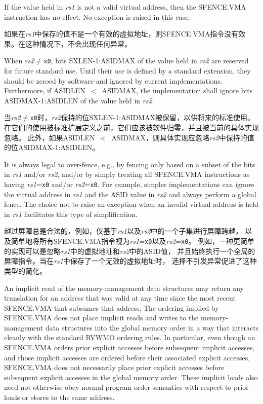 If the value held in {\em rs1} is not a valid virtual address, then the
SFENCE.VMA instruction has no effect.  No exception is raised in this case.

如果在{\em rs1}中保存的值不是一个有效的虚拟地址，则SFENCE.VMA指令没有效果。在这种情况下，不会出现任何异常。

When {\em rs2}$\neq${\tt x0}, bits SXLEN-1:ASIDMAX of the value held in {\em
rs2} are reserved for future standard use.  Until their use is defined by a
standard extension, they should be zeroed by software and ignored
by current implementations.  Furthermore, if ASIDLEN~$<$~ASIDMAX, the
implementation shall ignore bits ASIDMAX-1:ASIDLEN of the value held in {\em
rs2}.

当{\em rs2}$\neq${\tt x0}时，{\em rs2}保持的位SXLEN-1:ASIDMAX被保留，以供将来的标准使用。
在它们的使用被标准扩展定义之前，它们应该被软件归零，并且被当前的具体实现忽略。
此外，如果ASIDLEN~$<$~ASIDMAX，则具体实现应忽略{\em rs2}中保持的值的位ASIDMAX-1:ASIDLEN。

\begin{commentary}
It is always legal to over-fence, e.g., by fencing only based on a subset
of the bits in {\em rs1} and/or {\em rs2}, and/or by simply treating all
SFENCE.VMA instructions as having {\em rs1}={\tt x0} and/or
{\em rs2}={\tt x0}.  For example, simpler implementations can ignore the
virtual address in {\em rs1} and the ASID value in {\em rs2} and always perform
a global fence.  The choice not to raise an exception when an invalid virtual
address is held in {\em rs1} facilitates this type of simplification.

越过屏障总是合法的，例如，仅基于{\em rs1}以及{\em rs2}中的一个子集进行屏障跨越，
以及简单地将所有SFENCE.VMA指令视为{\em rs1}={\tt x0}以及{\em rs2}={\tt x0}。
例如，一种更简单的实现可以是忽略{\em rs1}中的虚拟地址和{\em rs2}中的ASID值，
并且始终执行一个全局的屏障指令。当在{\em rs1}中保存了一个无效的虚拟地址时，
选择不引发异常促进了这种类型的简化。

\end{commentary}

An implicit read of the memory-management data structures may return any
translation for an address that was valid at
any time since the most recent SFENCE.VMA that subsumes that address.  The
ordering implied by SFENCE.VMA does not place implicit reads and writes to the
memory-management data structures into the global memory order in a way that
interacts cleanly with the standard RVWMO ordering rules.  In particular, even
though an SFENCE.VMA orders prior explicit accesses before subsequent implicit
accesses, and those implicit accesses are ordered before their associated
explicit accesses, SFENCE.VMA does not necessarily place prior explicit
accesses before subsequent explicit accesses in the global memory order.  These
implicit loads also need not otherwise obey normal program order semantics with
respect to prior loads or stores to the same address.

